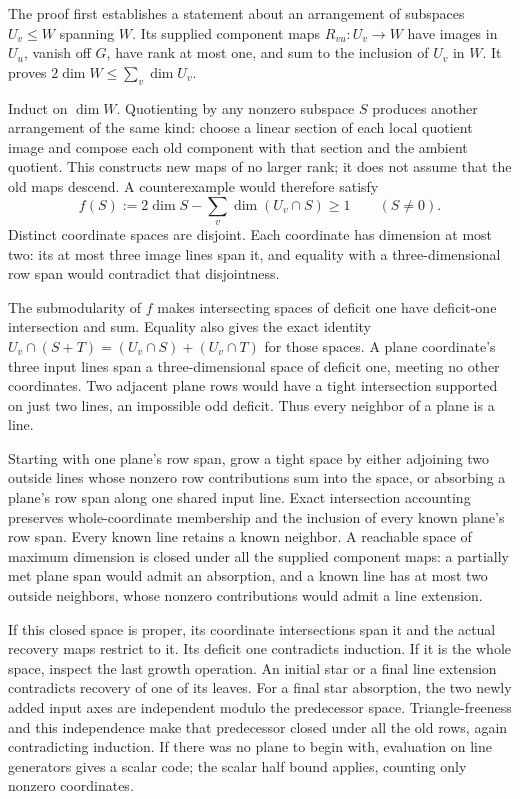 \begin{outline}
The proof first establishes a statement about an arrangement of subspaces
$U_v\leq W$ spanning $W$. Its supplied component maps
$R_{vu}:U_v\to W$ have images in $U_u$, vanish off $G$, have rank at most
one, and sum to the inclusion of $U_v$ in $W$.
It proves $2\dim W\leq\sum_v\dim U_v$.

Induct on $\dim W$. Quotienting by any nonzero subspace $S$ produces
another arrangement of the same kind: choose a linear section of each
local quotient image and compose each old component with that section
and the ambient quotient. This constructs new maps of no larger rank;
it does not assume that the old maps descend. A counterexample would
therefore satisfy
\[
 f(S):=2\dim S-\sum_v\dim(U_v\cap S)\geq1\qquad(S\ne0).
\]
Distinct coordinate spaces are disjoint. Each coordinate has dimension
at most two: its at most three image lines span it, and equality with a
three-dimensional row span would contradict that disjointness.

The submodularity of $f$ makes intersecting spaces of deficit one have
deficit-one intersection and sum. Equality also gives the exact identity
$U_v\cap(S+T)=(U_v\cap S)+(U_v\cap T)$ for those spaces.
A plane coordinate's three input lines span a three-dimensional space
of deficit one, meeting no other coordinates. Two adjacent plane rows
would have a tight intersection supported on just two lines, an
impossible odd deficit. Thus every neighbor of a plane is a line.

Starting with one plane's row span, grow a tight space by either adjoining
two outside lines whose nonzero row contributions sum into the space,
or absorbing a plane's row span along one shared input line. Exact
intersection accounting preserves whole-coordinate membership and the
inclusion of every known plane's row span. Every known line retains a
known neighbor. A reachable space of maximum dimension is closed under
all the supplied component maps: a partially met plane span would admit
an absorption, and a known line has at most two outside neighbors, whose
nonzero contributions would admit a line extension.

If this closed space is proper, its coordinate intersections span it
and the actual recovery maps restrict to it. Its deficit one contradicts
induction. If it is the whole space, inspect the last growth operation.
An initial star or a final line extension contradicts recovery of one
of its leaves. For a final star absorption, the two newly added input
axes are independent modulo the predecessor space. Triangle-freeness
and this independence make that predecessor closed under all the old
rows, again contradicting induction. If there was no plane to begin
with, evaluation on line generators gives a scalar code; the scalar
half bound applies, counting only nonzero coordinates.


\end{outline}
